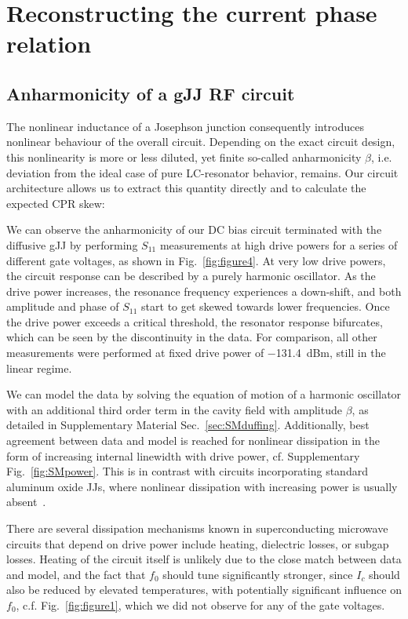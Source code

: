 \section{Reconstructing the current phase relation}

\subsection{Anharmonicity of a gJJ RF circuit}

The nonlinear inductance of a Josephson junction consequently introduces nonlinear behaviour of the overall circuit.
%
Depending on the exact circuit design, this nonlinearity is more or less diluted, yet finite so-called anharmonicity $\beta$, i.e. deviation from the ideal case of pure LC-resonator behavior, remains.
%
Our circuit architecture allows us to extract this quantity directly and to calculate the expected CPR skew:

We can observe the anharmonicity of our DC bias circuit terminated with the diffusive gJJ by performing $S_{11}$ measurements at high drive powers for a series of different gate voltages, as shown in Fig.~\ref{fig:figure4}.
%
At very low drive powers, the circuit response can be described by a purely harmonic oscillator.
%
As the drive power increases, the resonance frequency experiences a down-shift, and both amplitude and phase of $S_{11}$ start to get skewed towards lower frequencies.
%
Once the drive power exceeds a critical threshold, the resonator response bifurcates, which can be seen by the discontinuity in the data.
%
For comparison, all other measurements were performed at fixed drive power of \SI{-131.4}{dBm}, still in the linear regime.

We can model the data by solving the equation of motion of a harmonic oscillator with an additional third order term in the cavity field with  amplitude $\beta$, as detailed in Supplementary Material Sec.~\ref{sec:SMduffing}.
%
Additionally, best agreement between data and model is reached for nonlinear dissipation in the form of increasing internal linewidth with drive power, cf. Supplementary Fig.~\ref{fig:SMpower}.
%
This is in contrast with circuits incorporating standard aluminum oxide JJs, where nonlinear dissipation with increasing power is usually absent~\cite{boakninDispersiveMicrowaveBifurcation2007b}.

There are several dissipation mechanisms known in superconducting microwave circuits that depend on drive power include heating, dielectric losses, or subgap losses.
%
Heating of the circuit itself is unlikely due to the close match between data and model, and the fact that $f_0$ should tune significantly stronger, since $I_c$ should also be reduced by elevated temperatures, with potentially significant influence on $f_0$, c.f. Fig.~\ref{fig:figure1}, which we did not observe for any of the gate voltages.

